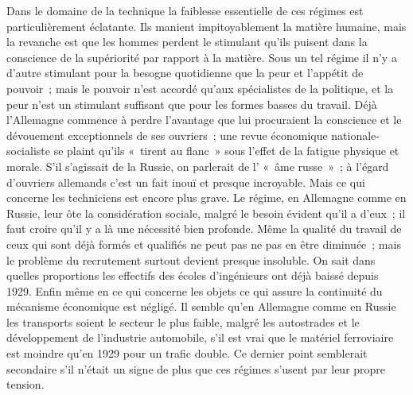 \documentclass[french,twoside]{book} %
\begin{document}
Dans le domaine de la technique la faiblesse essentielle de ces régimes est particulièrement éclatante. Ils manient impitoyablement la matière humaine, mais la revanche est que les hommes perdent le stimulant qu'ils puisent dans la conscience de la supériorité par rapport à la matière. Sous un tel régime il n'y a d'autre stimulant pour la besogne quotidienne que la peur et l'appétit de pouvoir ; mais le pouvoir n'est accordé qu'aux spécialistes de la politique, et la peur n'est un stimulant suffisant que pour les formes basses du travail. Déjà l'Allemagne commence à perdre l'avantage que lui procuraient la conscience et le dévouement exceptionnels de ses ouvriers ; une revue économique nationale-socialiste se plaint qu'ils « tirent au flanc » sous l'effet de la fatigue physique et morale. S'il s'agissait de la Russie, on parlerait de l' « âme russe » ; à l'égard d'ouvriers allemands c'est un fait inouï et presque incroya­ble. Mais ce qui concerne les techniciens est encore plus grave. Le régime, en Allemagne comme en Russie, leur ôte la considération sociale, malgré le besoin évident qu'il a d'eux ; il faut croire qu'il y a là une nécessité bien profonde. Même la qualité du travail de ceux qui sont déjà formés et qualifiés ne peut pas ne pas en être diminuée ; mais le problème du recrutement surtout devient presque insoluble. On sait dans quelles proportions les effectifs des écoles d'ingénieurs ont déjà baissé depuis 1929. Enfin même en ce qui concerne les objets ce qui assure la continuité du mécanisme économique est négligé. Il semble qu'en Allemagne comme en Russie les transports soient le secteur le plus faible, malgré les autostrades et le développement de l'industrie automobile, s'il est vrai que le matériel ferroviaire est moindre qu'en 1929 pour un trafic double. Ce dernier point semblerait secondaire s'il n'était un signe de plus que ces régimes s'usent par leur propre tension.\par
\end{document}
